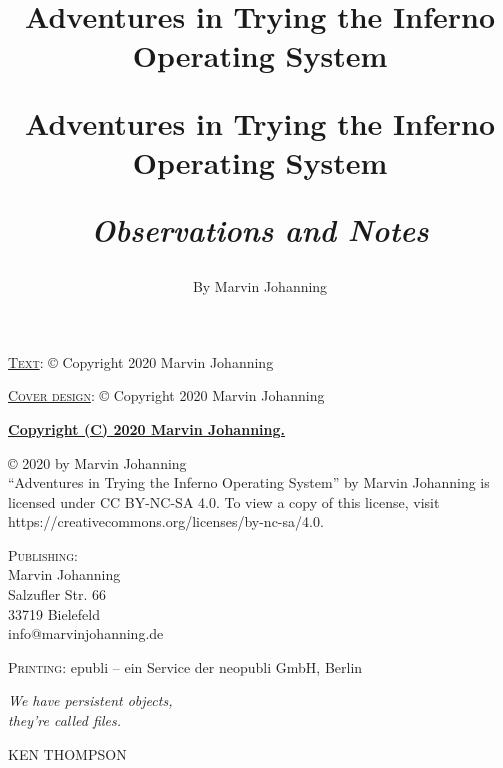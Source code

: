 \documentclass[a5paper,twoside,12pt]{report}
\newlength\longest
\begin{document}

\title{%
  Adventures in Trying the Inferno Operating System
}
\date{}
\author{}
\maketitle

\thispagestyle{empty}
  \mbox{}
  \newpage

\title{%
  Adventures in Trying the Inferno Operating System \\
  \begin{center}\textit{Observations and Notes}\end{center}
  \author{By Marvin Johanning}
}
\maketitle

\thispagestyle{empty}
\noindent\textsc{\underline{Text}}: © Copyright 2020 Marvin Johanning

\noindent\textsc{\underline{Cover design}}: © Copyright 2020 Marvin Johanning

\vspace{8mm}\noindent\textbf{\underline{Copyright (C) 2020 Marvin Johanning.}}

\noindent© 2020 by Marvin Johanning\\``Adventures in Trying the Inferno Operating System'' by Marvin Johanning is licensed under CC BY-NC-SA 4.0. To view a copy of this license, visit https://creativecommons.org\allowbreak/licenses/by-nc-sa/4.0.

\vspace{20mm}\noindent\textsc{Publishing}: \\
Marvin Johanning\\
Salzufler Str. 66\\
33719 Bielefeld\\
info@marvinjohanning.de

\vspace{25mm}\noindent\textsc{Printing}: epubli – ein Service der neopubli GmbH, Berlin
\newpage

\clearpage
\thispagestyle{empty}
\null\vfill
\settowidth{}
\begin{center}
\parbox{\longest}{%
  \raggedright{\huge\itshape%
    We have persistent objects, \\they're called files. \par\bigskip
  }
  \raggedleft\Large\MakeUppercase{Ken Thompson}\par%
}
\vfill\vfill
\clearpage\newpage
\end{center}
\newpage
\end{document}
